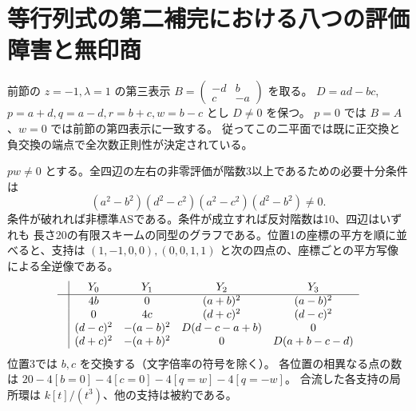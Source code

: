 \section{等行列式の第二補完における八つの評価障害と無印商}
\label{sec:equal-determinant-second-sheet}
前節の $z=-1,\lambda=1$ の第三表示 $B=\left(\begin{smallmatrix}-d&b\\c&-a\end{smallmatrix}\right)$ を取る。
$D=ad-bc$, $p=a+d,q=a-d,r=b+c,w=b-c$ とし $D\ne0$ を保つ。
$p=0$ では $B=A$、$w=0$ では前節の第四表示に一致する。
従ってこの二平面では既に正交換と負交換の端点で全次数正則性が決定されている。
\begin{theorem}\label{thm:equal-determinant-point-configurations}
$pw\ne0$ とする。全四辺の左右の非零評価が階数3以上であるための必要十分条件は
\[
    (a^2-b^2)(d^2-c^2)(a^2-c^2)(d^2-b^2)\ne0 .
\]
条件が破れれば非標準ASである。条件が成立すれば反対階数は10、四辺はいずれも
長さ20の有限スキームの同型のグラフである。位置1の座標の平方を順に並べると、支持は
$(1,-1,0,0),(0,0,1,1)$ と次の四点の、座標ごとの平方写像による全逆像である。
\[
\begin{array}{c|cccc}
 &Y_0&Y_1&Y_2&Y_3\\ \hline
 &4b&0&(a+b)^2&(a-b)^2\\
 &0&4c&(d+c)^2&(d-c)^2\\
 &(d-c)^2&-(a-b)^2&D(d-c-a+b)&0\\
 &(d+c)^2&-(a+b)^2&0&D(a+b-c-d)
\end{array}
\]
位置3では $b,c$ を交換する（文字倍率の符号を除く）。
各位置の相異なる点の数は $20-4[b=0]-4[c=0]-4[q=w]-4[q=-w]$。
合流した各支持の局所環は $k[t]/(t^3)$、他の支持は被約である。
\end{theorem}
